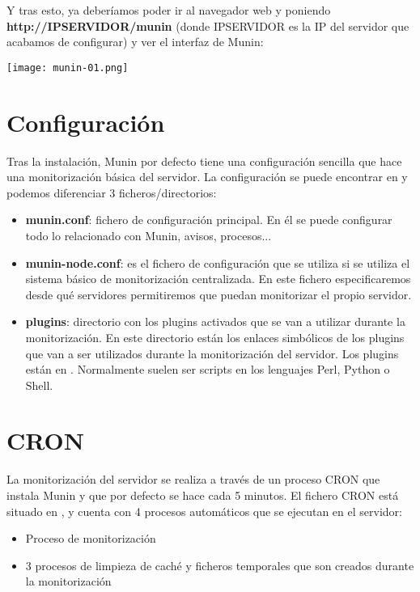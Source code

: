 Y tras esto, ya deberíamos poder ir al navegador web y poniendo \textbf{http://IPSERVIDOR/munin} (donde IPSERVIDOR es la IP del servidor que acabamos de configurar) y ver el interfaz de Munin:

\begin{tcolorbox}[title=Interfaz de Munin]
    \centering
    \texttt{[image: munin-01.png]}
\end{tcolorbox}


\section{Configuración}

Tras la instalación, Munin por defecto tiene una configuración sencilla que hace una monitorización básica del servidor. La configuración se puede encontrar en     y podemos diferenciar 3 ficheros/directorios:

\begin{itemize}
    \item \textbf{munin.conf}: fichero de configuración principal. En él se puede configurar todo lo relacionado con Munin, avisos, procesos...
    \item \textbf{munin-node.conf}: es el fichero de configuración que se utiliza si se utiliza el sistema básico de monitorización centralizada. En este fichero especificaremos desde qué servidores permitiremos que puedan monitorizar el propio servidor.
    \item \textbf{plugins}: directorio con los plugins activados que se van a utilizar durante la monitorización. En este directorio están los enlaces simbólicos de los plugins que van a ser utilizados durante la monitorización del servidor. Los plugins están en  . Normalmente suelen ser scripts en los lenguajes Perl, Python o Shell.
\end{itemize}

\section{CRON}

La monitorización del servidor se realiza a través de un proceso CRON que instala Munin y que por defecto se hace cada 5 minutos. El fichero CRON está situado en , y cuenta con 4 procesos automáticos que se ejecutan en el servidor:

\begin{itemize}
    \item Proceso de monitorización
    \item 3 procesos de limpieza de caché y ficheros temporales que son creados durante la monitorización
\end{itemize}


\clearpage